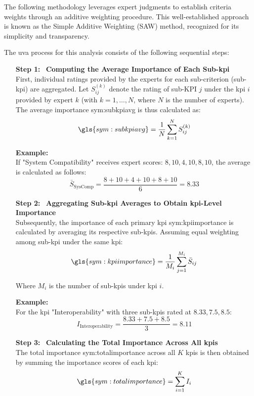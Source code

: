 The following methodology leverages expert judgments to establish criteria weights through an additive weighting procedure. This well-established approach is known as the Simple Additive Weighting (SAW) method, recognized for its simplicity and transparency. \autocite{Hwang.1981, Triantaphyllou.2000}

The \ac{uva} process for this analysis consists of the following sequential steps:

\begin{enumerate}[itemsep=\baselineskip]
    \item[\textbf{Step 1:}] ~\textbf{Computing the Average Importance of Each Sub-\ac{kpi}}\\
    First, individual ratings provided by the experts for each sub-criterion (sub-\ac{kpi}) are aggregated. Let \( S_{ij}^{(k)} \) denote the rating of sub-KPI \(j\) under the \ac{kpi} \(i\) provided by expert \(k\) (with \( k = 1, \dots, N \), where \( N \) is the number of experts).  The average importance \gls{sym:subkpiavg} is thus calculated as:
    \[
    \gls{sym:subkpiavg} = \frac{1}{N}\sum_{k=1}^{N}S_{ij}^{(k)}
    \]

    \vspace{\baselineskip}
    \textbf{Example:}\\
    If "System Compatibility" receives expert scores: \(8, 10, 4, 10, 8, 10\), the average is calculated as follows:
    \[
    \bar{S}_{\text{SysComp}} = \frac{8 + 10 + 4 + 10 + 8 + 10}{6} = 8.33
    \]

    \item[\textbf{Step 2:}] ~\textbf{Aggregating Sub-\ac{kpi} Averages to Obtain \ac{kpi}-Level Importance}\\
    Subsequently, the importance of each primary \ac{kpi} \gls{sym:kpiimportance} is calculated by averaging its respective sub-\ac{kpi}s. Assuming equal weighting among sub-\ac{kpi} under the same \ac{kpi}:
    \[
    \gls{sym:kpiimportance} = \frac{1}{M_i}\sum_{j=1}^{M_i}\bar{S}_{ij}
    \]

    Where \(M_{i}\) is the number of sub-\ac{kpi}s under \ac{kpi} \(i\).
    
    \vspace{\baselineskip}
    \textbf{Example:}\\
    For the \ac{kpi} "Interoperability" with three sub-\ac{kpi}s rated at \(8.33, 7.5, 8.5\):
    \[
    I_{\text{Interoperability}} = \frac{8.33 + 7.5 + 8.5}{3} = 8.11
    \]
    
    \item[\textbf{Step 3:}] ~\textbf{Calculating the Total Importance Across All \ac{kpi}s}\\
    The total importance \gls{sym:totalimportance} across all \(K\) \ac{kpi}s is then obtained by summing the importance scores of each \ac{kpi}:
    \[
    \gls{sym:totalimportance} = \sum_{i=1}^{K}I_i
    \]


\end{enumerate}
